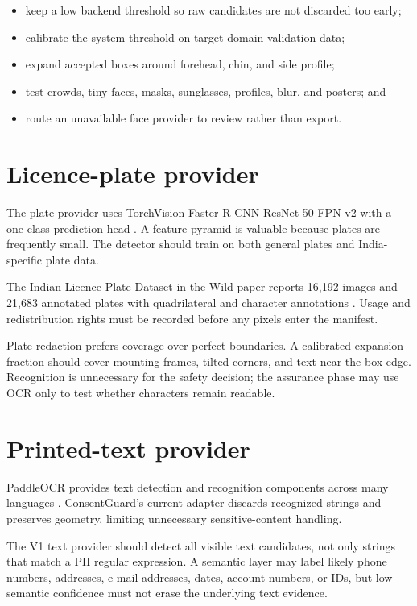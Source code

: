 \begin{itemize}[leftmargin=6mm]
  \item keep a low backend threshold so raw candidates are not discarded too early;
  \item calibrate the system threshold on target-domain validation data;
  \item expand accepted boxes around forehead, chin, and side profile;
  \item test crowds, tiny faces, masks, sunglasses, profiles, blur, and posters; and
  \item route an unavailable face provider to review rather than export.
\end{itemize}

\section{Licence-plate provider}

The plate provider uses TorchVision Faster R-CNN ResNet-50 FPN v2 with a one-class prediction head \citep{torchvisionfasterrcnn}. A feature pyramid is valuable because plates are frequently small. The detector should train on both general plates and India-specific plate data.

The Indian Licence Plate Dataset in the Wild paper reports 16,192 images and 21,683 annotated plates with quadrilateral and character annotations \citep{agarwal2021indianlpr}. Usage and redistribution rights must be recorded before any pixels enter the manifest.

Plate redaction prefers coverage over perfect boundaries. A calibrated expansion fraction should cover mounting frames, tilted corners, and text near the box edge. Recognition is unnecessary for the safety decision; the assurance phase may use OCR only to test whether characters remain readable.

\section{Printed-text provider}

PaddleOCR provides text detection and recognition components across many languages \citep{paddleocr2026}. ConsentGuard's current adapter discards recognized strings and preserves geometry, limiting unnecessary sensitive-content handling.

The V1 text provider should detect all visible text candidates, not only strings that match a PII regular expression. A semantic layer may label likely phone numbers, addresses, e-mail addresses, dates, account numbers, or IDs, but low semantic confidence must not erase the underlying text evidence.

